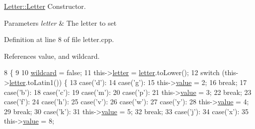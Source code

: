 \hyperlink{class_letter_aeaf51ffac3bafca1b1cc504381a6152f}{Letter\-::\-Letter} Constructor. 


\begin{DoxyParams}{Parameters}
{\em letter} & The letter to set \\
\hline
\end{DoxyParams}


Definition at line 8 of file letter.\-cpp.



References value, and wildcard.


\begin{DoxyCode}
8                           \{
9 
10     \hyperlink{class_letter_a6c34169c5f139924fb14154391bf1925}{wildcard} = \textcolor{keyword}{false};
11     this->\hyperlink{class_letter_a430f7ba15c252da3874f641422090fbd}{letter} = \hyperlink{class_letter_a430f7ba15c252da3874f641422090fbd}{letter}.toLower();
12     \textcolor{keywordflow}{switch} (this->\hyperlink{class_letter_a430f7ba15c252da3874f641422090fbd}{letter}.toLatin1()) \{
13     \textcolor{keywordflow}{case}(\textcolor{charliteral}{'d'}):
14     \textcolor{keywordflow}{case}(\textcolor{charliteral}{'g'}):
15         this->\hyperlink{class_letter_a5c6b1982acd4967eec202c562be7bc8f}{value} = 2;
16         \textcolor{keywordflow}{break};
17     \textcolor{keywordflow}{case}(\textcolor{charliteral}{'b'}):
18     \textcolor{keywordflow}{case}(\textcolor{charliteral}{'c'}):
19     \textcolor{keywordflow}{case}(\textcolor{charliteral}{'m'}):
20     \textcolor{keywordflow}{case}(\textcolor{charliteral}{'p'}):
21         this->\hyperlink{class_letter_a5c6b1982acd4967eec202c562be7bc8f}{value} = 3;
22         \textcolor{keywordflow}{break};
23     \textcolor{keywordflow}{case}(\textcolor{charliteral}{'f'}):
24     \textcolor{keywordflow}{case}(\textcolor{charliteral}{'h'}):
25     \textcolor{keywordflow}{case}(\textcolor{charliteral}{'v'}):
26     \textcolor{keywordflow}{case}(\textcolor{charliteral}{'w'}):
27     \textcolor{keywordflow}{case}(\textcolor{charliteral}{'y'}):
28        this->\hyperlink{class_letter_a5c6b1982acd4967eec202c562be7bc8f}{value} = 4;
29        \textcolor{keywordflow}{break};
30     \textcolor{keywordflow}{case}(\textcolor{charliteral}{'k'}):
31         this->\hyperlink{class_letter_a5c6b1982acd4967eec202c562be7bc8f}{value} = 5;
32         \textcolor{keywordflow}{break};
33     \textcolor{keywordflow}{case}(\textcolor{charliteral}{'j'}):
34     \textcolor{keywordflow}{case}(\textcolor{charliteral}{'x'}):
35         this->\hyperlink{class_letter_a5c6b1982acd4967eec202c562be7bc8f}{value} = 8;

\end{DoxyCode}
